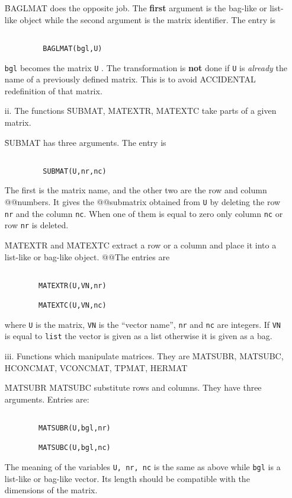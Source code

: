 \begin{itemize}
\f{BAGLMAT} does the opposite job. The {\bf first} argument is the
bag-like or list-like object while the second argument is the matrix
identifier. The entry is
\begin{verbatim}

         BAGLMAT(bgl,U)

\end{verbatim}
\verb+bgl+ becomes the matrix \verb+U+ . The transformation is
{\bf not} done if \verb+U+  is {\em already} the  name of a
previously  defined matrix. This is to avoid ACCIDENTAL redefinition
of that matrix.
\item[ii.]
The functions \f{SUBMAT, MATEXTR, MATEXTC} take parts of a given matrix.

\f{SUBMAT} has three arguments. The entry is
\begin{verbatim}

         SUBMAT(U,nr,nc)

\end{verbatim}
The first is the matrix name, and the other two are the row  and column
@@numbers.  It gives the
@@submatrix obtained from \verb+U+ by deleting the row \verb+nr+ and
the column \verb+nc+.
When one of them is equal to zero only column \verb+nc+
or row \verb+nr+ is deleted.

\f{MATEXTR} and \f{MATEXTC} extract a row or a column and place it into
a list-like or bag-like object.
@@The entries are
\begin{verbatim}

        MATEXTR(U,VN,nr)

        MATEXTC(U,VN,nc)

\end{verbatim}
where \verb+U+ is the matrix,  \verb+VN+ is the ``vector name'',
\verb+nr+  and \verb+nc+ are integers.  If \verb+VN+  is equal
to {\tt list} the vector  is given  as a list otherwise  it is
given as a bag.
\item[iii.]
Functions which manipulate matrices. They are
\f{MATSUBR, MATSUBC, HCONCMAT, VCONCMAT, TPMAT, HERMAT}

\f{MATSUBR MATSUBC} substitute rows and columns. They have three arguments.
Entries are:
\begin{verbatim}

        MATSUBR(U,bgl,nr)

        MATSUBC(U,bgl,nc)

\end{verbatim}
The meaning of the variables \verb+U, nr, nc+ is the same as above
while \verb+bgl+ is a list-like or bag-like vector.
Its  length should be compatible with the dimensions of the matrix.


\end{itemize}
